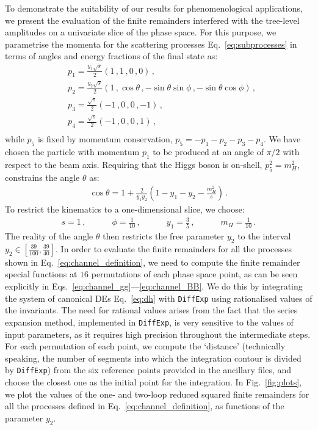 \documentclass[main.tex]{subfiles}
\begin{document}
To demonstrate the suitability of our results for phenomenological applications, we present the evaluation of the finite remainders interfered with the tree-level amplitudes on a univariate slice of the phase space. For this purpose, we parametrise the momenta for the scattering processes Eq.~\ref{eq:subprocesses} in terms of angles and energy fractions of the final state as:
\begin{equation} \label{eq:parametrisation}
\begin{aligned}
& p_1 = \frac{y_1 \sqrt{s}}{2} \left( 1\,, 1\,, 0\,, 0 \right) \,, \quad \\
& p_2 = \frac{y_2 \sqrt{s}}{2} \left( 1\,, \cos\theta\,, -\sin\theta \sin\phi \,, -\sin\theta \cos\phi \right) \,,  \\
& p_3 = \frac{\sqrt{s}}{2} \left(-1\,,0\,, 0 \,, -1 \right) \,,  \\
& p_4 = \frac{\sqrt{s}}{2} \left(-1\,,0\,, 0 \,, 1 \right) \,,  \\
\end{aligned}
\end{equation}
while $p_5$ is fixed by momentum conservation, $p_5 = -p_1-p_2-p_3-p_4$. We have chosen the particle with momentum $p_1$ to be produced at an angle of $\pi/2$ with respect to the beam axis.
Requiring that the Higgs boson is on-shell, $p_5^2 = m_H^2$, constrains the angle $\theta$ as:
\begin{align}
\cos\theta = 1+\frac{2}{y_1 y_2}\left(1-y_1-y_2-\frac{m_H^2}{s} \right)\,.
\end{align}
To restrict the kinematics to a one-dimensional slice, we choose:
\begin{align} \label{eq:fixparameters}
s = 1 \,, \quad \qquad \phi = \frac{1}{10} \,, \quad \qquad y_1 = \frac{3}{5} \,, \quad \qquad m_H = \frac{1}{10} \,.
\end{align}
The reality of the angle $\theta$ then restricts the free parameter $y_2$ to the interval $y_2 \in
[\frac{39}{100},\frac{39}{40}]$. In order to evaluate the finite remainders for all the processes
shown in Eq.~\ref{eq:channel_definition}, we need to compute the finite remainder special functions
at $16$ permutations of each phase space point, as can be seen explicitly in
Eqs.~\ref{eq:channel_gg}---\ref{eq:channel_BB}. We do this by integrating the system of canonical DEs Eq.~\ref{eq:dh} with \texttt{DiffExp} using rationalised values of the invariants. The need for rational values arises from the fact that the series expansion method, implemented in \texttt{DiffExp}, is very sensitive to the values of input parameters, as it requires high precision throughout the intermediate steps. For each permutation of each point, we compute the `distance' (technically speaking, the number of segments into which the integration contour is divided by \texttt{DiffExp}) from the six reference points provided in the ancillary files, and choose the closest one as the initial point for the integration. In Fig.~\ref{fig:plots}, we plot the values of the one- and two-loop reduced squared finite remainders for all the processes defined in Eq.~\ref{eq:channel_definition}, as functions of the parameter $y_2$.
\end{document}
